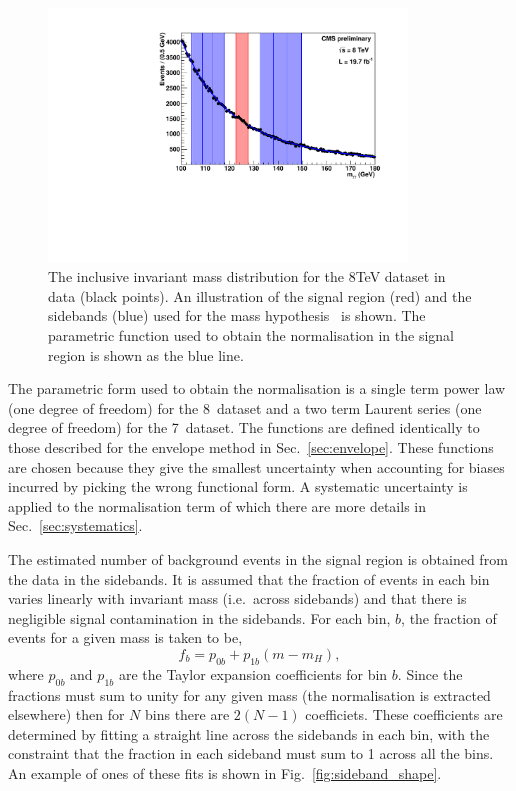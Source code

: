 \begin{figure}
  \begin{center}
    \includegraphics[width=0.85\textwidth]{analysis/plots/sideband/invmass.pdf}
    \caption[The invariant mass distribution for the 8~\TeV dataset]{The inclusive invariant mass distribution for the 8TeV dataset in data (black points). An illustration of the signal region (red) and the sidebands (blue) used for the mass hypothesis ~\GeV is shown. The parametric function used to obtain the normalisation in the signal region is shown as the blue line.}
    \label{fig:sideband_norm}
  \end{center}
\end{figure}

The parametric form used to obtain the normalisation is a single term power law (one degree of freedom) for the 8~\TeV dataset and a two term Laurent series (one degree of freedom) for the 7~\TeV dataset. The functions are defined identically to those described for the envelope method in Sec.~\ref{sec:envelope}. These functions are chosen because they give the smallest uncertainty when accounting for biases incurred by picking the wrong functional form. A systematic uncertainty is applied to the normalisation term of which there are more details in Sec.~\ref{sec:systematics}.

The estimated number of background events in the signal region is obtained from the data in the sidebands. It is assumed that the fraction of events in each bin varies linearly with invariant mass (i.e.~across sidebands) and that there is negligible signal contamination in the sidebands. For each bin, $b$, the fraction of events for a given mass is taken to be,
\begin{equation}
  f_{b} = p_{0b} + p_{1b}(m-m_{H}),
\end{equation}
where $p_{0b}$ and $p_{1b}$ are the Taylor expansion coefficients for bin $b$. Since the fractions must sum to unity for any given mass (the normalisation is extracted elsewhere) then for $N$ bins there are $2(N-1)$ coefficiets. These coefficients are determined by fitting a straight line across the sidebands in each bin, with the constraint that the fraction in each sideband must sum to 1 across all the bins. An example of ones of these fits is shown in Fig.~\ref{fig:sideband_shape}.


